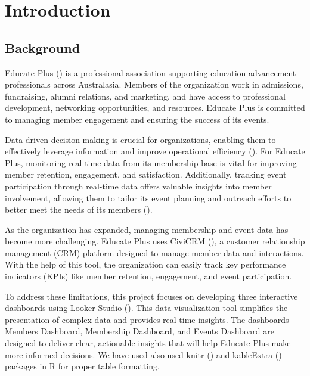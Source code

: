 \documentclass[11pt,a4paper,]{article}
\begin{document}
\newpage

\section{Introduction}\label{introduction}

\subsection{Background}\label{background}

Educate Plus (\textcite{educateplus}) is a professional association supporting education advancement professionals across Australasia. Members of the organization work in admissions, fundraising, alumni relations, and marketing, and have access to professional development, networking opportunities, and resources. Educate Plus is committed to managing member engagement and ensuring the success of its events.

Data-driven decision-making is crucial for organizations, enabling them to effectively leverage information and improve operational efficiency (\textcite{davenport2017competing}). For Educate Plus, monitoring real-time data from its membership base is vital for improving member retention, engagement, and satisfaction. Additionally, tracking event participation through real-time data offers valuable insights into member involvement, allowing them to tailor its event planning and outreach efforts to better meet the needs of its members (\textcite{trochlil2016mission}).

As the organization has expanded, managing membership and event data has become more challenging. Educate Plus uses CiviCRM (\textcite{civicrm}), a customer relationship management (CRM) platform designed to manage member data and interactions. With the help of this tool, the organization can easily track key performance indicators (KPIs) like member retention, engagement, and event participation.

To address these limitations, this project focuses on developing three interactive dashboards using Looker Studio (\textcite{google_2016}). This data visualization tool simplifies the presentation of complex data and provides real-time insights. The dashboards - Members Dashboard, Membership Dashboard, and Events Dashboard are designed to deliver clear, actionable insights that will help Educate Plus make more informed decisions. We have used also used knitr (\textcite{knitr}) and kableExtra (\textcite{kableExtra}) packages in R for proper table formatting.
\end{document}
